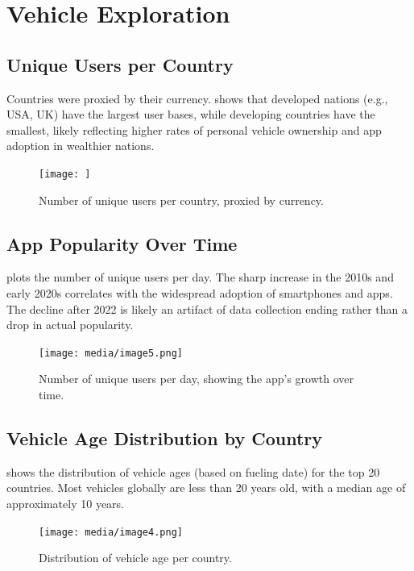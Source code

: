 \documentclass{article}
\begin{document}
\section{Vehicle Exploration}

\subsection{Unique Users per Country}
Countries were proxied by their currency.  shows that developed nations (e.g., USA, UK) have the largest user bases, while developing countries have the smallest, likely reflecting higher rates of personal vehicle ownership and app adoption in wealthier nations.

\begin{figure}[htbp]
    \centering
    \texttt{[image: ]}
    \caption{Number of unique users per country, proxied by currency.}
    \label{fig:users_per_country}
\end{figure}

\subsection{App Popularity Over Time}
 plots the number of unique users per day. The sharp increase in the 2010s and early 2020s correlates with the widespread adoption of smartphones and apps. The decline after 2022 is likely an artifact of data collection ending rather than a drop in actual popularity.

\begin{figure}[htbp]
    \centering
    \texttt{[image: media/image5.png]}
    \caption{Number of unique users per day, showing the app's growth over time.}
    \label{fig:users_per_day}
\end{figure}

\subsection{Vehicle Age Distribution by Country}
 shows the distribution of vehicle ages (based on fueling date) for the top 20 countries. Most vehicles globally are less than 20 years old, with a median age of approximately 10 years.

\begin{figure}[htbp]
    \centering
    \texttt{[image: media/image4.png]}
    \caption{Distribution of vehicle age per country.}
    \label{fig:vehicle_age}
\end{figure}
\end{document}
